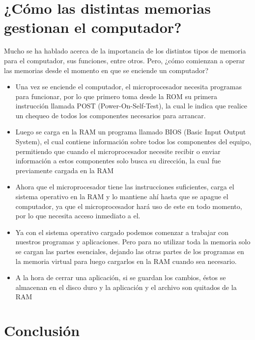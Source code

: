 \documentclass{article}
\begin{document}
\section{¿Cómo las distintas memorias gestionan el computador?} \label{contenido}
Mucho se ha hablado acerca de la importancia de los distintos tipos de memoria para el computador, sus funciones, entre otros. Pero, ¿cómo comienzan a operar las memorias desde el momento en que se enciende un computador?
\begin{itemize}

\item Una vez se enciende el computador, el microprocesador necesita programas para funcionar, por lo que primero toma desde la ROM su primera instrucción llamada POST (Power-On-Self-Test), la cual le indica que realice un chequeo de todos los componentes necesarios para arrancar.

\item Luego se carga en la RAM un programa llamado BIOS (Basic Input Output System), el cual contiene información sobre todos los componentes del equipo, permitiendo que cuando el microprocesador necesite recibir o enviar información a estos componentes solo busca su dirección, la cual fue previamente cargada en la RAM

\item Ahora que el microprocesador tiene las instrucciones suficientes, carga el sistema operativo en la RAM y lo mantiene ahí hasta que se apague el computador, ya que el microprocesador hará uso de este en todo momento, por lo que necesita acceso inmediato a el.

\item Ya con el sistema operativo cargado podemos comenzar a trabajar con nuestros programas y aplicaciones. Pero para no utilizar toda la memoria solo se cargan las partes esenciales, dejando las otras partes de los programas en la memoria virtual para luego cargarlos en la RAM cuando sea necesario.

\item A la hora de cerrar una aplicación, si se guardan los cambios, éstos se almacenan en el disco duro y la aplicación y el archivo son quitados de la RAM

\end{itemize}

\section{}

\section{Conclusión} \label{conclulsion}



\end{document}
